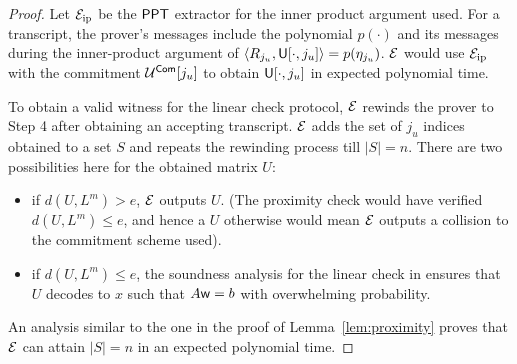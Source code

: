 \begin{proof}
Let $\mathcal{E}_{\mathrm{ip}}$ be the $\mathsf{PPT}$ extractor for the inner product argument used. For a transcript, the prover's messages include the polynomial $p(\cdot)$ and its messages during the inner-product argument of $\langle R_{j_u},\mathsf{U}[\cdot,j_u]\rangle = p(\eta_{j_u})$.
$\mathcal{E}$ would use $\mathcal{E}_{\mathrm{ip}}$ with the commitment $\mathcal{U}^{\mathsf{Com}}[j_u]$ to obtain $\mathsf{U}[\cdot,j_u]$ in expected polynomial time. 

To obtain a valid witness for the linear check protocol, $\mathcal{E}$ rewinds the prover to Step 4 after obtaining an accepting transcript. $\mathcal{E}$ adds the set of $j_u$ indices obtained to a set $S$ and repeats the rewinding process till $|S| = n$. 
There are two possibilities here for the obtained matrix $U$:
\begin{itemize}
\item if $d(U, L^m) > e$, $\mathcal{E}$ outputs $U$. (The proximity check would have verified $d(U,L^m) \leq e$, and hence a $U$ otherwise would mean $\mathcal{E}$ outputs a collision to the commitment scheme used).
\item if $d(U, L^m) \leq e$, the soundness analysis for the linear check in \cite{ligero} ensures that $U$ decodes to $x$ such that $A\mathsf{w}=b$ with overwhelming probability. %
\end{itemize}
An analysis similar to the one in the proof of Lemma~\ref{lem:proximity} proves that $\mathcal{E}$ can attain $|S| = n$ in an expected polynomial time.


\end{proof}
